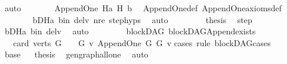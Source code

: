 \begin{isabellebody}
\ auto\isanewline
\ \ \ \ \isamarkupfalse%
\ \isamarkupfalse%
\ {\isachardoublequoteopen}Append{\isacharunderscore}{\kern0pt}One\ Ha\ H\ b{\isachardoublequoteclose}\ \isamarkupfalse%
\ Append{\isacharunderscore}{\kern0pt}One{\isacharunderscore}{\kern0pt}def\ Append{\isacharunderscore}{\kern0pt}One{\isacharunderscore}{\kern0pt}axioms{\isacharunderscore}{\kern0pt}def\ \isanewline
\ \ \ \ \ \ \isamarkupfalse%
\ bD{\isacharunderscore}{\kern0pt}Ha\ b{\isacharunderscore}{\kern0pt}in\ del{\isacharunderscore}{\kern0pt}v\ nre\ step{\isachardot}{\kern0pt}hyps{\isacharparenleft}{\kern0pt}{}{\isacharparenright}{\kern0pt}\ \isamarkupfalse%
\ auto\ \isanewline
\ \ \ \ \isamarkupfalse%
\ \isamarkupfalse%
\ {\isacharquery}{\kern0pt}thesis\ \isamarkupfalse%
\ step\isanewline
\ \ \ \ \ \ \isamarkupfalse%
\ bD{\isacharunderscore}{\kern0pt}Ha\ b{\isacharunderscore}{\kern0pt}in\ del{\isacharunderscore}{\kern0pt}v\ \isamarkupfalse%
\ auto\ \isanewline
\ \ \isamarkupfalse%
\ \ \isanewline
{}\isamarkupfalse%
%
\endisatagproof
{\isafoldproof}%
%
\isadelimproof
\isanewline
%
\endisadelimproof
\isanewline
{}\isamarkupfalse%
\ {\isacharparenleft}{\kern0pt}\ blockDAG{\isacharparenright}{\kern0pt}\ blockDAG{\isacharunderscore}{\kern0pt}Append{\isacharunderscore}{\kern0pt}exists{\isacharcolon}{\kern0pt}\isanewline
\ \ \ {\isachardoublequoteopen}card\ {\isacharparenleft}{\kern0pt}verts\ G{\isacharparenright}{\kern0pt}\ {\isacharequal}{\kern0pt}\ {}\ {\isasymor}\ {\isacharparenleft}{\kern0pt}{\isasymexists}G{}\ v{\isachardot}{\kern0pt}\ Append{\isacharunderscore}{\kern0pt}One\ G{}\ G\ v{\isacharparenright}{\kern0pt}{\isachardoublequoteclose}\isanewline
%
\isadelimproof
%
\endisadelimproof
%
\isatagproof
{}\isamarkupfalse%
{\isacharparenleft}{\kern0pt}cases\ rule{\isacharcolon}{\kern0pt}\ blockDAG{\isacharunderscore}{\kern0pt}cases{}{\isacharparenright}{\kern0pt}\isanewline
\ \ \isamarkupfalse%
\ base\isanewline
{}\isamarkupfalse%
\ \isamarkupfalse%
\ {\isacharquery}{\kern0pt}thesis\ \isamarkupfalse%
\ gen{\isacharunderscore}{\kern0pt}graph{\isacharunderscore}{\kern0pt}all{\isacharunderscore}{\kern0pt}one\ \isamarkupfalse%
\ auto\isanewline
{}\isamarkupfalse%
\isanewline

\end{isabellebody}
